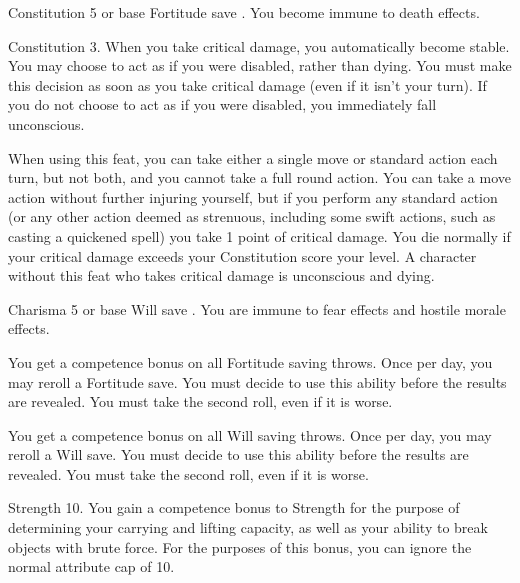 \featpre Constitution 5 or base Fortitude save .
\featben You become immune to death effects.

 Constitution 3.
 When you take critical damage, you automatically become stable. You may choose to act as if you were disabled, rather than dying. You must make this decision as soon as you take critical damage (even if it isn't your turn). If you do not choose to act as if you were disabled, you immediately fall unconscious.
\par When using this feat, you can take either a single move or standard action each turn, but not both, and you cannot take a full round action. You can take a move action without further injuring yourself, but if you perform any standard action (or any other action deemed as strenuous, including some swift actions, such as casting a quickened spell) you take 1 point of critical damage. You die normally if your critical damage exceeds your Constitution score \add your level.
 A character without this feat who takes critical damage is unconscious and dying.

\featpre Charisma 5 or base Will save .
\featben You are immune to fear effects and hostile morale effects.

 You get a  competence bonus on all Fortitude saving throws. Once per day, you may reroll a Fortitude save. You must decide to use this ability before the results are revealed. You must take the second roll, even if it is worse.


 You get a  competence bonus on all Will saving throws. Once per day, you may reroll a Will save. You must decide to use this ability before the results are revealed. You must take the second roll, even if it is worse.

\featpre Strength 10.
\featben You gain a  competence bonus to Strength for the purpose of determining your carrying and lifting capacity, as well as your ability to break objects with brute force. For the purposes of this bonus, you can ignore the normal attribute cap of 10.

